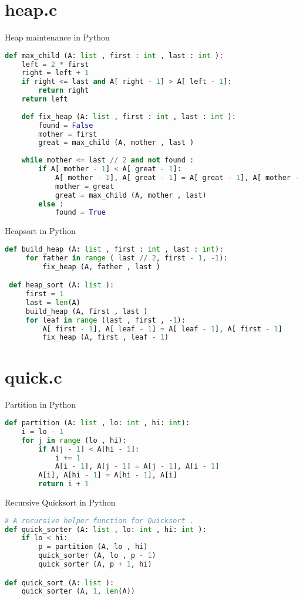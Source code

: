 \documentclass{article}
\begin{document}
\section{heap.c}
Heap maintenance in Python
\begin{lstlisting}[language=Python]
def max_child (A: list , first : int , last : int ):
    left = 2 * first
    right = left + 1
    if right <= last and A[ right - 1] > A[ left - 1]:
        return right
    return left
    
    def fix_heap (A: list , first : int , last : int ):
        found = False
        mother = first
        great = max_child (A, mother , last )
    
    while mother <= last // 2 and not found :
        if A[ mother - 1] < A[ great - 1]:
            A[ mother - 1], A[ great - 1] = A[ great - 1], A[ mother - 1]
            mother = great
            great = max_child (A, mother , last)
        else :
            found = True
\end{lstlisting}
Heapsort in Python
\begin{lstlisting}[language=Python]
 def build_heap (A: list , first : int , last : int):
     for father in range ( last // 2, first - 1, -1):
         fix_heap (A, father , last )

 def heap_sort (A: list ):
     first = 1
     last = len(A)
     build_heap (A, first , last )
     for leaf in range (last , first , -1):
         A[ first - 1], A[ leaf - 1] = A[ leaf - 1], A[ first - 1]
         fix_heap (A, first , leaf - 1)
\end{lstlisting}
\section{quick.c}
Partition in Python
\begin{lstlisting}[language=Python]
def partition (A: list , lo: int , hi: int):
    i = lo - 1
    for j in range (lo , hi):
        if A[j - 1] < A[hi - 1]:
            i += 1
            A[i - 1], A[j - 1] = A[j - 1], A[i - 1]
        A[i], A[hi - 1] = A[hi - 1], A[i]
        return i + 1
\end{lstlisting}
Recursive Quicksort in Python
\begin{lstlisting}[language=Python]
# A recursive helper function for Quicksort .
def quick_sorter (A: list , lo: int , hi: int ):
    if lo < hi:
        p = partition (A, lo , hi)
        quick_sorter (A, lo , p - 1)
        quick_sorter (A, p + 1, hi)

def quick_sort (A: list ):
    quick_sorter (A, 1, len(A))
\end{lstlisting}
\end{document}
